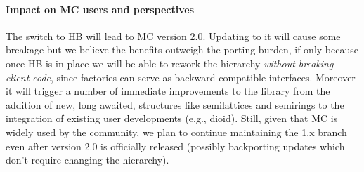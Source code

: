 \documentclass{easychair}
\def\MC{{\sf MC}}
\def\HB{{\sf HB}}
\begin{document}
\paragraph{Impact on \MC{} users and perspectives}

The switch to \HB{} will lead to \MC{} version 2.0. Updating to it will cause some
breakage but we believe the benefits outweigh the porting burden, if only because
once \HB{} is in place we will be able to rework the hierarchy
\emph{without breaking client code}, since factories can serve as backward
compatible interfaces. Moreover it will trigger a number
of immediate improvements to the library from the addition of new, long awaited,
structures like semilattices and semirings to the integration of existing user
developments (e.g., dioid).
%
Still, given that \MC{} is widely used by the community, we plan to continue
maintaining the 1.x branch even after version 2.0 is officially released
(possibly backporting updates which don't require changing the hierarchy).

\label{sect:bib}

%
%
%


\end{document}
